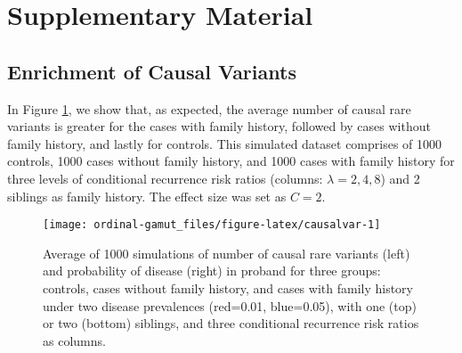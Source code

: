 \documentclass[]{article}
\theoremstyle{definition}
\theoremstyle{definition}
\theoremstyle{definition}
\theoremstyle{remark}
\begin{document}
\newpage

\hypertarget{supplementary-material}{%
\section*{Supplementary Material}\label{supplementary-material}}

\hypertarget{enrichment-of-causal-variants}{%
\subsection*{Enrichment of Causal
Variants}\label{enrichment-of-causal-variants}}

In Figure \ref{fig:causalvar}, we show that, as expected, the average
number of causal rare variants is greater for the cases with family
history, followed by cases without family history, and lastly for
controls. This simulated dataset comprises of 1000 controls, 1000 cases
without family history, and 1000 cases with family history for three
levels of conditional recurrence risk ratios (columns:
\(\lambda=2,4,8\)) and 2 siblings as family history. The effect size was
set as \(C=2\).

\begin{figure}[H]

{\centering \texttt{[image: ordinal-gamut\_files/figure-latex/causalvar-1]} 

}

\caption{Average of 1000 simulations of number of causal rare variants (left) and probability of disease (right) in proband for three groups: controls, cases without family history, and cases with family history under two disease prevalences (red=0.01, blue=0.05), with one (top) or two (bottom) siblings, and three conditional recurrence risk ratios as columns.}\label{fig:causalvar}
\end{figure}


\end{document}
